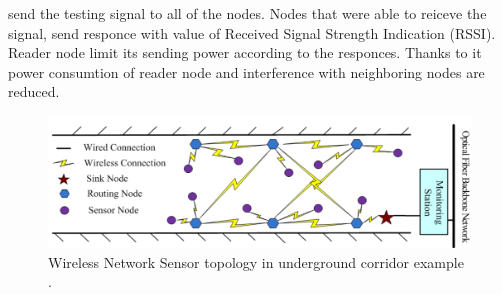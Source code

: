 \documentclass[../main.tex]{subfiles}
\begin{document}
send the testing signal to all of the nodes. Nodes that were able to reiceve the signal, send responce with value of Received Signal Strength Indication (RSSI). Reader node limit its sending power according to the responces. Thanks to it power consumtion of reader node and interference with neighboring nodes are reduced.

\begin{figure}[!htbp]
\includegraphics[width=\textwidth]{pictures/wsn_topology.png}
\centering
\caption{Wireless Network Sensor topology in underground corridor example \cite{WSN_monitoring}. }
\label{fig:wsn_topology}
\end{figure}
\end{document}
